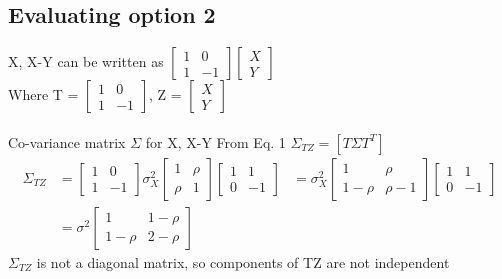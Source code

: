 \documentclass[journal,12pt,twocolumn]{IEEEtran}
\begin{document}
\subsection{Evaluating option 2}
X, X-Y can be written as
$\begin{bmatrix}
   1   &   0\\
   1   &   -1
\end{bmatrix}
\begin{bmatrix}
   X \\
   Y
\end{bmatrix}$\\
Where T = $\begin{bmatrix}
   1   &   0\\
   1   &   -1
\end{bmatrix}$, Z = $\begin{bmatrix}
   X \\
   Y
\end{bmatrix}$\\
\\
Co-variance matrix $\Sigma$ for X, X-Y
From Eq. 1 $\Sigma_{TZ} = [T\Sigma T^T]$
\begin{align*}
    \Sigma_{TZ} &= \begin{bmatrix}
   1   &   0\\
   1   &   -1
\end{bmatrix} \sigma_X^2 
\begin{bmatrix}
   1    & \rho \\
   \rho &  1 
\end{bmatrix}
\begin{bmatrix}
   1   &   1\\
   0   &   -1
\end{bmatrix}
&= \sigma_X^2 \begin{bmatrix}
    1         &   \rho\\
    1 - \rho  &    \rho - 1
\end{bmatrix}
\begin{bmatrix}
    1     &   1\\
    0     & - 1
\end{bmatrix}\\
& = \sigma^2 \begin{bmatrix}
   1         &    1 - \rho\\
   1 - \rho  &    2 - \rho
\end{bmatrix}
\end{align*}
$\Sigma_{TZ}$ is not a diagonal matrix, so components of TZ are not independent
\end{document}

